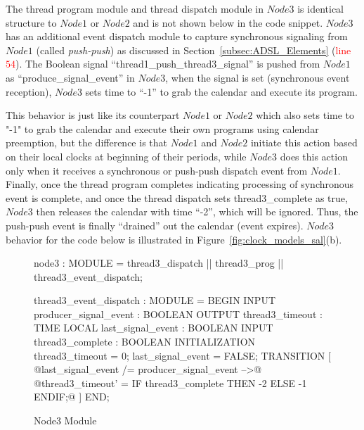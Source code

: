 The thread program module and thread dispatch module in $Node3$ is
identical structure to $Node1$ or $Node2$ and is not shown below in the code
snippet. $Node3$ has an additional event dispatch module to capture synchronous
signaling from $Node1$ (called \emph{push-push}) as discussed in
Section~\ref{subsec:ADSL_Elements} (\textcolor{red}{line $54$}). The Boolean
signal “thread1\_push\_thread3\_signal” is pushed from $Node1$ as
“produce\_signal\_event” in $Node3$, when the signal is set (synchronous event
reception), $Node3$ sets time to “-1” to grab the calendar and execute its
program.

This behavior is just like its counterpart $Node1$ or $Node2$ which
also sets time to "-1" to grab the calendar and execute their own programs
using calendar preemption, but the difference is that $Node1$ and
$Node2$ initiate this action based on their local clocks at beginning of their
periods, while $Node3$ does this action only when it receives a synchronous or
push-push dispatch event from $Node1$. Finally, once the thread program
completes indicating processing of synchronous event is complete, and once the
thread dispatch sets thread3\_complete as true, $Node3$ then releases the
calendar with time “-2”, which will be ignored. Thus, the push-push event is
finally “drained” out the calendar (event expires). $Node3$ behavior for the
code below is illustrated in Figure~\ref{fig:clock_models_sal}(b).

\begin{figure}[ht]
\centering
\begin{sal}[firstnumber=48]
node3 : MODULE =
  thread3_dispatch
  ||
  thread3_prog
  ||
  thread3_event_dispatch;

thread3_event_dispatch : MODULE = 
BEGIN
  INPUT producer_signal_event : BOOLEAN
  OUTPUT thread3_timeout : TIME
  LOCAL last_signal_event : BOOLEAN
  INPUT thread3_complete : BOOLEAN
  INITIALIZATION
    thread3_timeout = 0;
    last_signal_event = FALSE;
  TRANSITION
    [
    @last_signal_event /= producer_signal_event -->@
           @thread3_timeout' = IF thread3_complete THEN -2 ELSE -1 ENDIF;@
    ]
END;
\end{sal}
\caption{Node3 Module}
\label{fig:node3-module}
\end{figure}

\FloatBarrier
